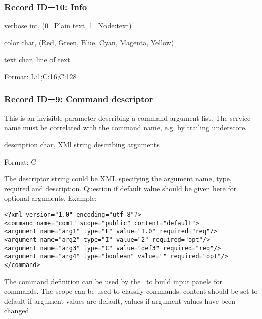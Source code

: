 \subsubsection{Record ID=10: Info}
\begin{compactdesc}
\item[verbose]   int,  (0=Plain text, 1=Node:text)
\item[color]   char,  (Red, Green, Blue, Cyan, Magenta, Yellow)
\item[text]   char,  line of text
\item[Format:] L:1;C:16;C:128
\end{compactdesc}

\subsubsection{Record ID=9: Command descriptor}
This is an invisible parameter describing a command argument list. The service name must be correlated with the command name, e.g. by trailing underscore.
\begin{compactdesc}
\item[description]   char,  XMl string describing arguments
\item[Format:] C
\end{compactdesc}

The descriptor string could be XML specifying the argument name, type, required and description. Question if default value should be given here for optional arguments. Example:
\begin{verbatim}
<?xml version="1.0" encoding="utf-8"?>
<command name="com1" scope="public" content="default">
<argument name="arg1" type="F" value="1.0" required="req"/>
<argument name="arg2" type="I" value="2" required="opt"/>
<argument name="arg3" type="C" value="def3" required="req"/>
<argument name="arg4" type="boolean" value="" required="opt"/>
</command>
\end{verbatim}
The command definition can be used by the \gui\ to build input panels for commands. The scope can be used to classify commands, content should be set to default if argument values are default, values if argument values have been changed.
